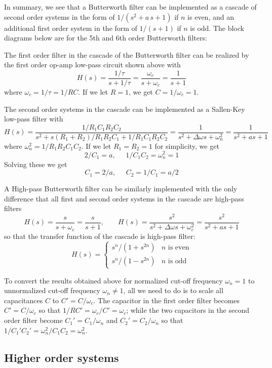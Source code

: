   In summary, we see that a Butterworth filter can be implemented as
  a cascade of second order systems in the form of $1/(s^2+a\,s+1)$ 
  if $n$ is even, and an additional first order system in the form of
  $1/(s+1)$ if $n$ is odd. The block diagrams below are for the 5th 
  and 6th order Butterworth filters:


  The first order filter in the cascade of the Butterworth filter 
  can be realized by the first order op-amp low-pass circuit shown
  above with
  \[
  H(s)=\frac{1/\tau}{s+1/\tau}=\frac{\omega_c}{s+\omega_c}=\frac{1}{s+1}
  \]
  where $\omega_c=1/\tau=1/RC$. If we let $R=1$, we get $C=1/\omega_c=1$. 

  The second order systems in the cascade can be implemented as a 
  Sallen-Key low-pass filter with 
  \[
  H(s)=\frac{1/R_1C_1R_2C_2}{s^2+s(R_1+R_2)/R_1R_2C_1+1/R_1C_1R_2C_2}
  =\frac{1}{s^2+\Delta\omega s+\omega_n^2}=\frac{1}{s^2+a s+1}
  \]
  where $\omega_n^2=1/R_1R_2C_1C_2$. If we let $R_1=R_2=1$ for simplicity, 
  we get
  \[
  2/C_1=a,\;\;\;\;\;1/C_1C_2=\omega_n^2=1
  \]
  Solving these we get
  \[
  C_1=2/a,\;\;\;\;\; C_2=1/C_1=a/2
  \]

  A High-pass Butterworth filter can be similarly implemented with the only
  difference that all first and second order systems in the cascade are
  high-pass filters
  \[
  H(s)=\frac{s}{s+\omega_c}=\frac{s}{s+1},\;\;\;\;\;\;\;
  H(s)=\frac{s^2}{s^2+\Delta\omega s+\omega_c^2}=\frac{s^2}{s^2+a s+1}
  \]
  so that the transfer function of the cascade is high-pass filter:
  \[
  H(s)=\left\{\begin{array}{cc}s^n/(1+s^{2n}) & \mbox{$n$ is even}\\
  s^n/(1-s^{2n}) & \mbox{$n$ is odd}\end{array}\right.
  \]

  To convert the results obtained above for normalized cut-off frequency 
  $\omega_n=1$ to unnormalized cut-off frequency $\omega_n\ne 1$, all we 
  need to do is to scale all capacitances $C$ to $C'=C/\omega_c$. The 
  capacitor in the first order filter becomes $C'=C/\omega_c$ so that
  $1/RC'=\omega_c/C'=\omega_c$; while the two capacitors in the second order
  filter become $C_1'=C_1/\omega_n$ and $C_2'=C_2/\omega_n$ so that
  $1/C_1'C_2'=\omega_n^2/C_1C_2=\omega_n^2$.

\subsection{Higher order systems}

